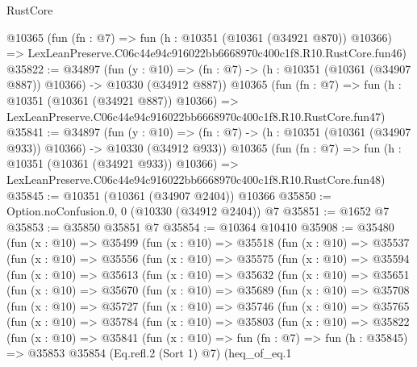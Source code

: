 \begin{lexlean}{RustCore}
\begin{coremodule}
    @10365
    (fun (fn : @7) =>
    fun (h : @10351 (@10361 (@34921 @870)) @10366) =>
    LexLeanPreserve.C06c44e94c916022bb6668970c400c1f8.R10.RustCore.fun46)
@35822 := @34897
    (fun (y : @10) =>
    (fn : @7) -> (h : @10351 (@10361 (@34907 @887)) @10366) -> @10330 (@34912 @887))
    @10365
    (fun (fn : @7) =>
    fun (h : @10351 (@10361 (@34921 @887)) @10366) =>
    LexLeanPreserve.C06c44e94c916022bb6668970c400c1f8.R10.RustCore.fun47)
@35841 := @34897
    (fun (y : @10) =>
    (fn : @7) -> (h : @10351 (@10361 (@34907 @933)) @10366) -> @10330 (@34912 @933))
    @10365
    (fun (fn : @7) =>
    fun (h : @10351 (@10361 (@34921 @933)) @10366) =>
    LexLeanPreserve.C06c44e94c916022bb6668970c400c1f8.R10.RustCore.fun48)
@35845 := @10351 (@10361 (@34907 @2404)) @10366
@35850 := Option.noConfusion.{0, 0} (@10330 (@34912 @2404)) @7
@35851 := @1652 @7
@35853 := @35850 @35851 @7
@35854 := @10364 @10410
@35908 := @35480
    (fun (x : @10) =>
    @35499
      (fun (x : @10) =>
      @35518
        (fun (x : @10) =>
        @35537
          (fun (x : @10) =>
          @35556
            (fun (x : @10) =>
            @35575
              (fun (x : @10) =>
              @35594
                (fun (x : @10) =>
                @35613
                  (fun (x : @10) =>
                  @35632
                    (fun (x : @10) =>
                    @35651
                      (fun (x : @10) =>
                      @35670
                        (fun (x : @10) =>
                        @35689
                          (fun (x : @10) =>
                          @35708
                            (fun (x : @10) =>
                            @35727
                              (fun (x : @10) =>
                              @35746
                                (fun (x : @10) =>
                                @35765
                                  (fun (x : @10) =>
                                  @35784
                                    (fun (x : @10) =>
                                    @35803
                                      (fun (x : @10) =>
                                      @35822
                                        (fun (x : @10) =>
                                        @35841
                                          (fun (x : @10) =>
                                          fun (fn : @7) =>
                                          fun (h : @35845) =>
                                          @35853
                                            @35854
                                            (Eq.refl.{2} (Sort 1) @7)
                                            (heq_of_eq.{1}

\end{coremodule}
\end{lexlean}
